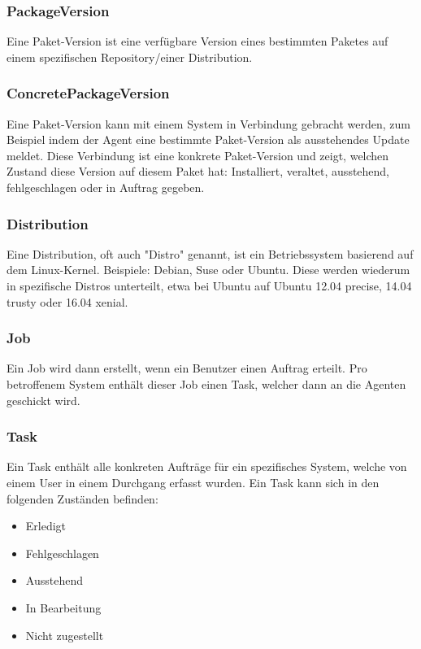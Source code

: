 \subsubsection{PackageVersion}

Eine Paket-Version ist eine verfügbare Version eines bestimmten Paketes auf einem spezifischen Repository/einer Distribution.

\subsubsection{ConcretePackageVersion}

Eine Paket-Version kann mit einem System in Verbindung gebracht werden, zum Beispiel indem der Agent eine bestimmte Paket-Version als ausstehendes Update meldet. Diese Verbindung ist eine konkrete Paket-Version und zeigt, welchen Zustand diese Version auf diesem Paket hat: Installiert, veraltet, ausstehend, fehlgeschlagen oder in Auftrag gegeben.

\subsubsection{Distribution}

Eine Distribution, oft auch "Distro" genannt, ist ein Betriebssystem basierend auf dem Linux-Kernel. Beispiele: Debian, Suse oder Ubuntu. Diese werden wiederum in spezifische Distros unterteilt, etwa bei Ubuntu auf Ubuntu 12.04 precise, 14.04 trusty oder 16.04 xenial. 

\subsubsection{Job}

Ein Job wird dann erstellt, wenn ein Benutzer einen Auftrag erteilt. Pro betroffenem System enthält dieser Job einen Task, welcher dann an die Agenten geschickt wird.

\subsubsection{Task}

Ein Task enthält alle konkreten Aufträge für ein spezifisches System, welche von einem User in einem Durchgang erfasst wurden. Ein Task kann sich in den folgenden Zuständen befinden:

\begin{itemize}
    \item Erledigt 
    \item Fehlgeschlagen 
    \item Ausstehend
    \item In Bearbeitung
    \item Nicht zugestellt
\end{itemize}

